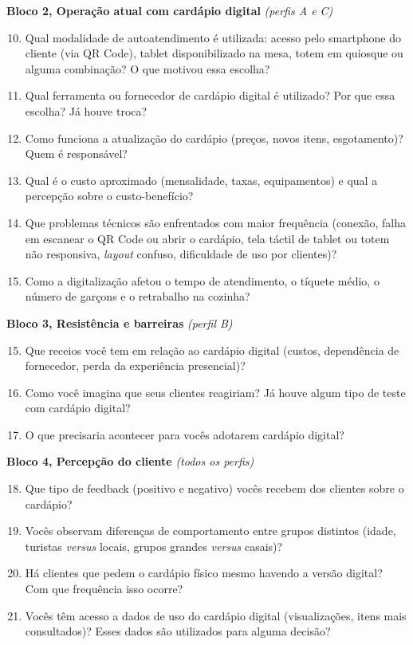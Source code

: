 \noindent\textbf{Bloco 2, Operação atual com cardápio digital} \emph{(perfis A e C)}
\begin{enumerate}\setcounter{enumi}{9}
	\item Qual modalidade de autoatendimento é utilizada: acesso pelo smartphone do cliente (via QR Code), tablet disponibilizado na mesa, totem em quiosque ou alguma combinação? O que motivou essa escolha?
	\item Qual ferramenta ou fornecedor de cardápio digital é utilizado? Por que essa escolha? Já houve troca?
	\item Como funciona a atualização do cardápio (preços, novos itens, esgotamento)? Quem é responsável?
	\item Qual é o custo aproximado (mensalidade, taxas, equipamentos) e qual a percepção sobre o custo-benefício?
	\item Que problemas técnicos são enfrentados com maior frequência (conexão, falha em escanear o QR Code ou abrir o cardápio, tela táctil de tablet ou totem não responsiva, \emph{layout} confuso, dificuldade de uso por clientes)?
	\item Como a digitalização afetou o tempo de atendimento, o tíquete médio, o número de garçons e o retrabalho na cozinha?
\end{enumerate}

\noindent\textbf{Bloco 3, Resistência e barreiras} \emph{(perfil B)}
\begin{enumerate}\setcounter{enumi}{14}
	\item Que receios você tem em relação ao cardápio digital (custos, dependência de fornecedor, perda da experiência presencial)?
	\item Como você imagina que seus clientes reagiriam? Já houve algum tipo de teste com cardápio digital?
	\item O que precisaria acontecer para vocês adotarem cardápio digital?
\end{enumerate}

\noindent\textbf{Bloco 4, Percepção do cliente} \emph{(todos os perfis)}
\begin{enumerate}\setcounter{enumi}{17}
	\item Que tipo de feedback (positivo e negativo) vocês recebem dos clientes sobre o cardápio?
	\item Vocês observam diferenças de comportamento entre grupos distintos (idade, turistas \emph{versus} locais, grupos grandes \emph{versus} casais)?
	\item Há clientes que pedem o cardápio físico mesmo havendo a versão digital? Com que frequência isso ocorre?
	\item Vocês têm acesso a dados de uso do cardápio digital (visualizações, itens mais consultados)? Esses dados são utilizados para alguma decisão?
\end{enumerate}

